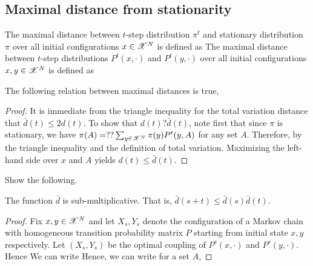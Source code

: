 \documentclass[letterpaper,english,10pt]{article}
\begin{document}
\subsection{Maximal distance from stationarity}
\begin{defn}
The maximal distance between $t$-step distribution $\pi^t$ and stationary distribution $\pi$ over all initial configurations $x \in\mathscr{X}^N$ is defined as 
The maximal distance between $t$-step distributions $P^t(x, \cdot)$ and $P^t(y, \cdot)$ over all initial configurations $x, y \in\mathscr{X}^N$ is defined as 
\end{defn}
\begin{lem} The following relation between maximal distances is true, 
\end{lem}
\begin{proof} 
It is immediate from the triangle inequality for the total variation distance that $\bar{d}(t) \le 2d(t)$.
To show that $d(t) ? \bar{d}(t)$, note first that since $\pi$ is stationary, 
we have $\pi(A) = ??\sum_{y \in \mathscr{X}^N}\pi(y)P^t(y, A)$ for any set $A$. 
Therefore, 
by the triangle inequality and the definition of total variation. 
Maximizing the left-hand side over $x$ and $A$ yields $d(t) \le \bar{d}(t)$.  
\end{proof}
\begin{exerc}
Show the following. 
\end{exerc}
\begin{lem}
The function $\bar{d}$ is sub-multiplicative. 
That is, $\bar{d}(s + t) \le \bar{d}(s)\bar{d}(t)$. 
\end{lem}
\begin{proof} 
Fix $x, y \in \mathscr{X}^N$ and let $X_s, Y_s$ denote the configuration of a Markov chain with homogeneous transition probability matrix $P$ starting from initial state $x,y$ respectively. 
Let $(X_s, Y_s)$ be the optimal coupling of $P^s(x, \cdot)$ and $P^s(y, \cdot)$. 
Hence 
We can write 
Hence, we can write for a set $A$, 
\end{proof}
\end{document}

